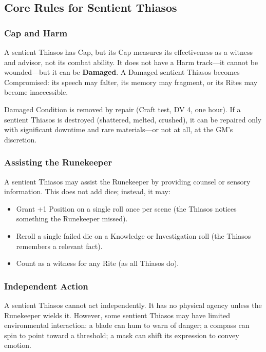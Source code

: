 \subsection{Core Rules for Sentient Thiasos}

\subsubsection{Cap and Harm}

A sentient Thiasos has Cap, but its Cap measures its effectiveness as a witness and advisor, not its combat ability. It does not have a Harm track—it cannot be wounded—but it can be \textbf{Damaged}. A Damaged sentient Thiasos becomes Compromised: its speech may falter, its memory may fragment, or its Rites may become inaccessible.

Damaged Condition is removed by repair (Craft test, DV 4, one hour). If a sentient Thiasos is destroyed (shattered, melted, crushed), it can be repaired only with significant downtime and rare materials—or not at all, at the GM's discretion.

\subsubsection{Assisting the Runekeeper}

A sentient Thiasos may assist the Runekeeper by providing counsel or sensory information. This does not add dice; instead, it may:

\begin{itemize}
\item Grant +1 Position on a single roll once per scene (the Thiasos notices something the Runekeeper missed).
\item Reroll a single failed die on a Knowledge or Investigation roll (the Thiasos remembers a relevant fact).
\item Count as a witness for any Rite (as all Thiasos do).
\end{itemize}

\subsubsection{Independent Action}

A sentient Thiasos cannot act independently. It has no physical agency unless the Runekeeper wields it. However, some sentient Thiasos may have limited environmental interaction: a blade can hum to warn of danger; a compass can spin to point toward a threshold; a mask can shift its expression to convey emotion.

